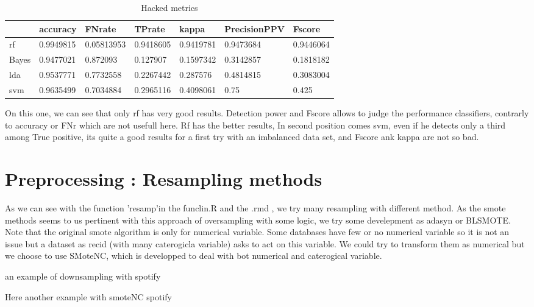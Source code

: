 \documentclass[
]{report}
\begin{document}
\begin{table}

\caption{\label{tab:unnamed-chunk-7}Hacked metrics}
\centering
\begin{tabular}[t]{l|l|l|l|l|l|l}
\hline
  & accuracy & FNrate & TPrate & kappa & PrecisionPPV & Fscore\\
\hline
rf & 0.9949815 & 0.05813953 & 0.9418605 & 0.9419781 & 0.9473684 & 0.9446064\\
\hline
Bayes & 0.9477021 & 0.872093 & 0.127907 & 0.1597342 & 0.3142857 & 0.1818182\\
\hline
lda & 0.9537771 & 0.7732558 & 0.2267442 & 0.287576 & 0.4814815 & 0.3083004\\
\hline
svm & 0.9635499 & 0.7034884 & 0.2965116 & 0.4098061 & 0.75 & 0.425\\
\hline
\end{tabular}
\end{table}

On this one, we can see that only rf has very good results. Detection power and Fscore allows to judge the performance classifiers, contrarly to accuracy or FNr which are not usefull here. Rf has the better results, In second position comes svm, even if he detects only a third among True positive, its quite a good results for a first try with an imbalanced data set, and Fscore ank kappa are not so bad.

\hypertarget{preprocessing-resampling-methods}{%
\section{Preprocessing : Resampling methods}\label{preprocessing-resampling-methods}}

As we can see with the function 'resamp'in the funclin.R and the .rmd , we try many resampling with different method. As the smote methods seems to us pertinent with this approach of oversampling with some logic, we try some develepment as adasyn or BLSMOTE.
Note that the original smote algorithm is only for numerical variable. Some databases have few or no numerical variable so it is not an issue but a dataset as recid (with many caterogicla variable) asks to act on this variable. We could try to transform them as numerical but we choose to use SMoteNC, which is developped to deal with bot numerical and caterogical variable.

an example of downsampling with spotify

Here another example with smoteNC spotify
\end{document}
